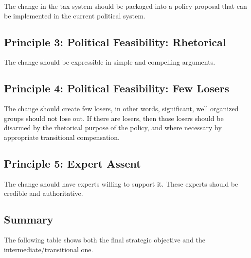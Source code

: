 \documentclass[]{tufte-handout}
\begin{document}
The change in the tax system should be packaged into a policy proposal
that can be implemented in the current political system.

\hypertarget{principle-3-political-feasibility-rhetorical}{%
\subsection{Principle 3: Political Feasibility:
Rhetorical}\label{principle-3-political-feasibility-rhetorical}}

The change should be expressible in simple and compelling arguments.

\hypertarget{principle-4-political-feasibility-few-losers}{%
\subsection{Principle 4: Political Feasibility: Few
Losers}\label{principle-4-political-feasibility-few-losers}}

The change should create few losers, in other words, significant, well
organized groups should not lose out. If there are losers, then those
losers should be disarmed by the rhetorical purpose of the policy, and
where necessary by appropriate transitional compensation.

\hypertarget{principle-5-expert-assent}{%
\subsection{Principle 5: Expert
Assent}\label{principle-5-expert-assent}}

The change should have experts willing to support it. These experts
should be credible and authoritative.

\hypertarget{summary}{%
\subsection{Summary}\label{summary}}

The following table shows both the final strategic objective and the
intermediate/transitional one.
\end{document}

